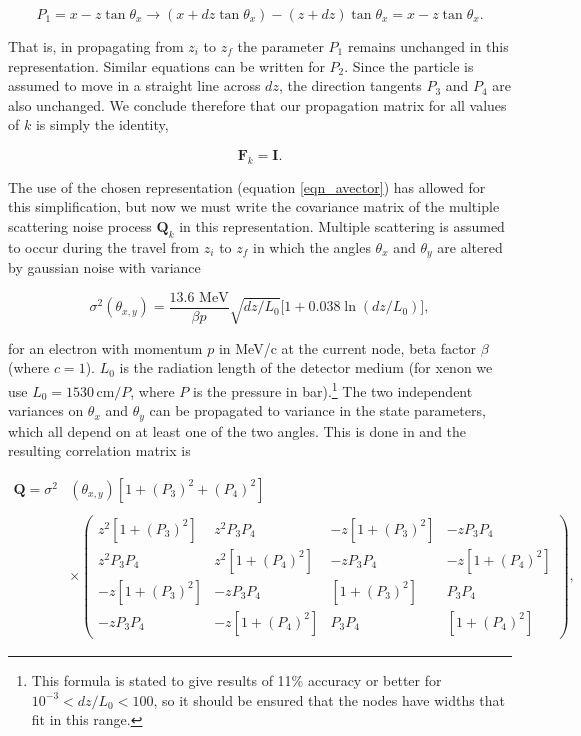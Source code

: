\documentclass[10pt]{article}
\begin{document}
\begin{equation}
 P_{1} = x - z\tan\theta_{x} \rightarrow (x + dz\tan\theta_{x}) - (z + dz)\tan\theta_{x} = x - z\tan\theta_{x}.
\end{equation}

\noindent That is, in propagating from $z_{i}$ to $z_{f}$ the parameter $P_{1}$ remains unchanged in this representation.  Similar equations can be written 
for $P_{2}$.  Since the particle is assumed to move in a straight line across $dz$, the direction tangents $P_{3}$ and $P_{4}$ are also unchanged.  We conclude
therefore that our propagation matrix for all values of $k$ is simply the identity,

\begin{equation}
 \mathbf{F}_{k} = \mathbf{I}.
\end{equation}

\noindent The use of the chosen representation (equation \ref{eqn_avector}) has allowed for this simplification, but now we must write the covariance matrix 
of the multiple scattering noise process $\mathbf{Q}_{k}$ in this representation.  Multiple scattering is assumed to occur during the travel from $z_{i}$
to $z_{f}$ in which the angles $\theta_{x}$ and $\theta_{y}$ are altered by gaussian noise with variance \cite{RPP_2012}

\begin{equation}
 \sigma^{2}(\theta_{x,y}) = \frac{13.6\,\,\mathrm{MeV}}{\beta p}\sqrt{dz/L_{0}}\bigl[1 + 0.038\ln(dz/L_{0})\bigr],
\end{equation}

\noindent for an electron with momentum $p$ in MeV/c at the current node, beta factor $\beta$ (where $c = 1$).  $L_{0}$ is the radiation length of the
detector medium (for xenon we use $L_{0} = 1530 \,\mathrm{cm} / P$, where $P$ is the pressure in bar).\footnote{This formula is stated to give results of 
11\% accuracy or better for $10^{-3} < dz/L_{0} < 100$, so it should be ensured that the nodes have widths that fit in this range.}
The two independent variances on $\theta_{x}$ and $\theta_{y}$ can be propagated to variance in the state parameters, which all depend on at least
one of the two angles.  This is done in \cite{Wolin_1993} and the resulting correlation matrix is

\begin{equation}
\begin{split}
 \mathbf{Q} = \sigma^{2} & (\theta_{x,y})[1 + (P_{3})^{2} + (P_{4})^{2}] \\\\
  & \times \left(\begin{array}{cccc} z^{2}[1 + (P_{3})^{2}] & z^{2}P_{3}P_{4} & -z[1 + (P_{3})^{2}] & -zP_{3}P_{4}\\ z^{2}P_{3}P_{4} & z^{2}[1 + (P_{4})^{2}] & -zP_{3}P_{4} & -z[1 + (P_{4})^{2}]\\ -z[1 + (P_{3})^{2}] & -zP_{3}P_{4} & [1 + (P_{3})^{2}] & P_{3}P_{4}\\ -zP_{3}P_{4} & -z[1 + (P_{4})^{2}] & P_{3}P_{4} & [1 + (P_{4})^{2}] \end{array} \right),
\end{split}
\end{equation}
\end{document}
